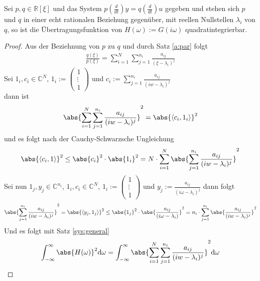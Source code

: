 \begin{lemma}\label{sys:quad}
Sei $p, q \in \mathbb{R}[\xi]$ und das System $p(\frac{d}{dt})y = q(\frac{d}{dt})u$ gegeben und stehen sich $p$ und $q$ in einer echt rationalen Beziehung gegenüber, mit reellen Nullstellen $\lambda_i$ von $q$, so ist die Übertragungsfunktion von $H(\omega) := G(i\omega)$ quadratintegrierbar. 
\begin{proof}
Aus der Beziehnung von $p$ zu $q$ und durch Satz \ref{a:par} folgt
\begin{align}
	\frac{q(\xi)}{p(\xi)} = \sum_{i=1}^{N}{\sum_{j=1}^{n_i}{\frac{a_{ij}}{(\xi - \lambda_i)^j}}} \label{gl:rat}
\end{align}
Sei $1_i, c_i \in \mathbb{C}^N$,  $1_i :=\left(\begin{array}{c}
1 \\ 
\vdots \\ 
1
\end{array}\right)$ und $c_i:= \sum_{j=1}^{n_i}\frac{a_{ij}}{(iw-\lambda_i)^j}$\\
dann ist 
\begin{align}
	\abs{\sum_{i=1}^{N}{\sum_{j=1}^{n_i}{\frac{a_{ij}}{(iw - \lambda_i)^j}}}}^2 = \abs{\langle c_i, 1_i \rangle}^2 
\end{align}
und es folgt nach der Cauchy-Schwarzsche Ungleichung
\begin{align}
	\abs{\langle c_i, 1 \rangle}^2 \leq \abs{c_i}^2 \cdot \abs{1_i}^2 = N \cdot \sum_{i=1}^{N}{\abs{\sum_{j=1}^{n_i}{\frac{a_{ij}}{(iw - \lambda_i)^j}}}^2}
\end{align}
Sei nun $1_j, y_j \in \mathbb{C}^{n_i}$, $1_i, c_i \in \mathbb{C}^N$,  $1_i :=\left(\begin{array}{c}
1 \\ 
\vdots \\ 
1
\end{array}\right)$ und $y_j := \frac{a_{ij}}{(i\omega - \lambda_i)^j}$ dann folgt
\begin{align}
	{\abs{\sum_{j=1}^{n_i}{\frac{a_{ij}}{(iw -\lambda_i)^j}}}^2} = \abs{\langle y_j, 1_j \rangle}^2 \leq \abs{1_j}^2 \cdot \abs{\frac{a_{ij}}{(i\omega -\lambda_i)}}^2 = n_i \cdot \sum_{j=1}^{n_i}{\abs{\frac{a_{ij}}{(iw -\lambda_i)^j}}^2}
\end{align}
Und es folgt mit Satz \ref{sys:general}
\begin{align}
	\int_{-\infty}^{\infty} \abs{H(\omega)}^2 \mathrm{d\omega} &= \int_{-\infty}^{\infty} \abs{\sum_{i=1}^{N}{\sum_{j=1}^{n_i}{\frac{a_{ij}}{(iw - \lambda_i)^j}}}}^2 \mathrm{d\omega}\\

\end{align}
\end{proof}
\end{lemma}
